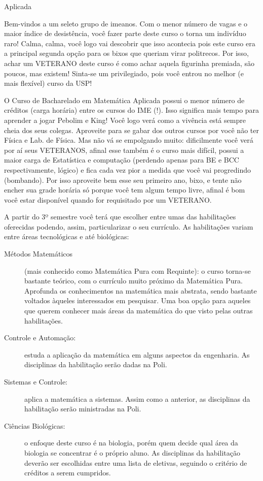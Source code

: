 \begin{subsecao}{Aplicada}

Bem-vindos a um seleto grupo de imeanos. Com o menor número de vagas e o
maior índice de desistência, você fazer parte deste curso o torna um indivíduo
raro! Calma, calma, você logo vai descobrir que isso acontecia pois este curso
era a principal segunda opção para os bixos que queriam virar politrecos. Por
isso, achar um VETERANO deste curso é como achar aquela figurinha premiada, são
poucos, mas existem! Sinta-se um privilegiado, pois você entrou no melhor (e
mais flexível) curso da USP!

O Curso de Bacharelado em Matemática Aplicada possui o menor número de
créditos (carga horária) entre os cursos do IME (!). Isso significa mais tempo
para aprender a jogar Pebolim e King! Você logo verá como a vivência está sempre
 cheia dos seus colegas.
Aproveite para se gabar dos outros cursos por você não ter Física e Lab. de
Física. Mas não vá se empolgando muito: dificilmente você verá por aí seus
VETERANOS, afinal esse também é o curso mais difícil, possui a maior carga de
Estatística e computação (perdendo apenas para BE e BCC respectivamente,
lógico) e fica cada vez pior a medida que você vai progredindo (bombando). Por
isso aproveite bem esse seu primeiro ano, bixo, e tente não encher sua grade
horária só porque você tem algum tempo livre, afinal é bom você estar
disponível quando for requisitado por um VETERANO.

A partir do 3º semestre você terá que escolher entre umas das habilitações
oferecidas podendo, assim, particularizar o seu currículo. As habilitações
variam entre áreas tecnológicas e até biológicas:
\begin{description}
\item [Métodos Matemáticos] (mais conhecido como Matemática Pura com Requinte):
o curso torna-se bastante teórico, com o currículo muito próximo da Matemática
Pura. Aprofunda os conhecimentos na matemática mais abstrata, sendo bastante
voltados àqueles interessados em pesquisar. Uma boa opção para aqueles que
querem conhecer mais áreas da matemática do que visto pelas outras habilitações.
\item [Controle e Automação:] estuda a aplicação da matemática em alguns
aspectos da engenharia. As disciplinas da habilitação serão dadas na Poli.
\item  [Sistemas e Controle:] aplica a matemática a sistemas. Assim como a
anterior, as disciplinas da habilitação serão ministradas na Poli.
\item  [Ciências Biológicas:] o enfoque deste curso é na biologia, porém quem
decide qual área da biologia se concentrar é o próprio aluno. As disciplinas da
habilitação deverão ser escolhidas entre uma lista de eletivas, seguindo o
critério de créditos a serem cumpridos.
\end{description}


\end{subsecao}
